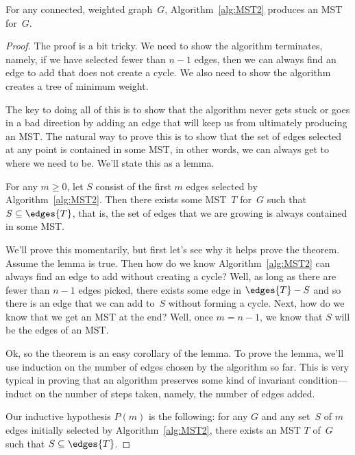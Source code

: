 \begin{theorem}\label{thm:MST2}
For any connected, weighted graph~$G$, Algorithm~\ref{alg:MST2}
produces an MST for~$G$.
\end{theorem}

\begin{proof}
The proof is a bit tricky.  We need to show the algorithm terminates,
namely, if we have selected fewer than $n - 1$ edges, then we can
always find an edge to add that does not create a cycle.  We also need
to show the algorithm creates a tree of minimum weight.

The key to doing all of this is to show that the algorithm never gets
stuck or goes in a bad direction by adding an edge that will keep us
from ultimately producing an MST\@.  The natural way to prove this is
to show that the set of edges selected at any point is contained in
some MST, in other words, we can always get to where we need to be.
We'll state this as a lemma.

\begin{lemma}\label{lemma:MST2}
  For any $m \ge 0$, let $S$ consist of the first $m$ edges selected by
  Algorithm~\ref{alg:MST2}.  Then there exists some MST~$T$ for~$G$ such
  that $S \subseteq \edges{T}$, that is, the set of edges that we are
  growing is always contained in some MST\@.
\end{lemma}

We'll prove this momentarily, but first let's see why it helps prove
the theorem.  Assume the lemma is true.  Then how do we know
Algorithm~\ref{alg:MST2} can always find an edge to add without
creating a cycle?  Well, as long as there are fewer than $n - 1$ edges
picked, there exists some edge in $\edges{T} - S$ and so there is an
edge that we can add to~$S$ without forming a cycle.  Next, how do we
know that we get an MST at the end?  Well, once $m = n - 1$, we know
that $S$ will  be the edges of an
MST\@.

Ok, so the theorem is an easy corollary of the lemma.  To prove the
lemma, we'll use induction on the number of edges chosen by the
algorithm so far.  This is very typical in proving that an algorithm
preserves some kind of invariant condition---induct on the number of
steps taken, namely, the number of edges added.

Our inductive hypothesis $P(m)$ is the following: for any $G$ and any
set~$S$ of $m$ edges initially selected by Algorithm~\ref{alg:MST2},
there exists an MST $T$ of~$G$ such that $S \subseteq \edges{T}$.


\end{proof}
